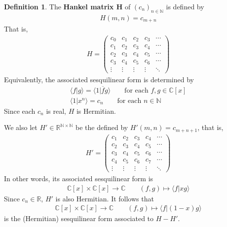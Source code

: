 \documentclass[12pt,b5paper,notitlepage]{article}
\theoremstyle{definition}
\newtheorem{df}{Definition}[section]
\theoremstyle{plain}
\newcommand{\ovl}{\overline}
\newcommand{\bk}[1]{\langle {#1}\rangle}
\newcommand{\bigbk}[1]{\big\langle {#1}\big\rangle}
\newcommand{\Cbb}{\mathbb C}
\newcommand{\Nbb}{\mathbb N}
\newcommand{\Rbb}{\mathbb R}
\newcommand{\hqed}{\hfill\qedsymbol}
\numberwithin{equation}{section}
\begin{document}
\begin{df}\label{lb203}
The \textbf{Hankel matrix $\pmb H$}  of $(c_n)_{n\in\Nbb}$ is defined by
\begin{align*}
H(m,n)=c_{m+n}
\end{align*}
That is,
\begin{align*}
H=\begin{pmatrix}
c_0&c_1&c_2&c_3&\cdots\\
c_1&c_2&c_3&c_4&\cdots\\
c_2&c_3&c_4&c_5&\cdots\\
c_3&c_4&c_5&c_6&\cdots\\
\vdots&\vdots&\vdots&\vdots&\ddots
\end{pmatrix}
\end{align*}
Equivalently, the associated sesquilinear form is determined by
\begin{subequations}\label{eq80}
\begin{gather}
\bigbk{f\big|g}=\bigbk{1\big|\ovl fg}\qquad\text{for each }f,g\in\Cbb[x]\label{eq80a}\\
\bigbk{1\big|x^n}=c_n\qquad\text{for each }n\in\Nbb\label{eq80b}
\end{gather}
\end{subequations}
Since each $c_n$ is real, $H$ is Hermitian.

We also let $H'\in\Rbb^{\Nbb\times \Nbb}$ be the defined by $H'(m,n)=c_{m+n+1}$, that is,
\begin{align*}
H'=\begin{pmatrix}
c_1&c_2&c_3&c_4&\cdots\\
c_2&c_3&c_4&c_5&\cdots\\
c_3&c_4&c_5&c_6&\cdots\\
c_4&c_5&c_6&c_7&\cdots\\
\vdots&\vdots&\vdots&\vdots&\ddots
\end{pmatrix}
\end{align*}
In other words, its associated sesquilinear form is
\begin{align}\label{eq81}
\Cbb[x]\times\Cbb[x]\rightarrow\Cbb\qquad (f,g)\mapsto \bk{f|xg}
\end{align}
Since $c_n\in\Rbb$, $H'$ is also Hermitian. It follows that
\begin{align}\label{eq82}
\Cbb[x]\times\Cbb[x]\rightarrow\Cbb\qquad (f,g)\mapsto \bk{f|(1-x)g}
\end{align}
is the (Hermitian) sesquilinear form associated to $H-H'$. \hqed
\end{df}
\end{document}
